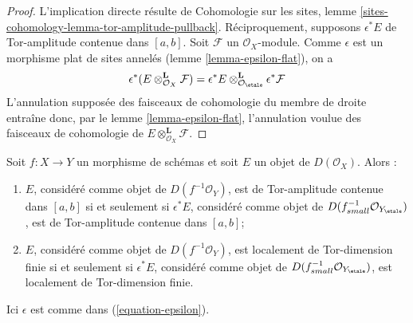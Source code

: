 \begin{proof}
L'implication directe r\'esulte de Cohomologie sur les sites, lemme
\ref{sites-cohomology-lemma-tor-amplitude-pullback}.
R\'eciproquement, supposons $\epsilon^*E$ de Tor-amplitude contenue dans
$[a,b]$.
Soit $\mathcal{F}$ un $\mathcal{O}_X$-module. Comme $\epsilon$ est un
morphisme plat de sites annel\'es (lemme \ref{lemma-epsilon-flat}), on a
$$
\epsilon^*(E \otimes^\mathbf{L}_{\mathcal{O}_X} \mathcal{F})
=
\epsilon^*E
\otimes^\mathbf{L}_{\mathcal{O}_\etale}
\epsilon^*\mathcal{F}
$$
L'annulation suppos\'ee des faisceaux de cohomologie du membre de droite
entra\^ine donc, par le lemme \ref{lemma-epsilon-flat}, l'annulation voulue
des faisceaux de cohomologie de
$E \otimes^\mathbf{L}_{\mathcal{O}_X} \mathcal{F}$.
\end{proof}

\begin{lemma}
\label{lemma-tor-dimension-rel}
Soit $f : X \to Y$ un morphisme de sch\'emas et soit $E$ un objet de
$D(\mathcal{O}_X)$. Alors :
\begin{enumerate}
\item $E$, consid\'er\'e comme objet de $D(f^{-1}\mathcal{O}_Y)$, est
de Tor-amplitude contenue dans $[a,b]$ si et seulement si $\epsilon^*E$,
consid\'er\'e
comme objet de $D(f_{small}^{-1}\mathcal{O}_{Y_\etale})$, est de Tor-amplitude
contenue dans $[a,b]$;
\item $E$, consid\'er\'e comme objet de $D(f^{-1}\mathcal{O}_Y)$, est
localement de Tor-dimension finie si et seulement si $\epsilon^*E$,
consid\'er\'e comme objet de
$D(f_{small}^{-1}\mathcal{O}_{Y_\etale})$, est localement de Tor-dimension
finie.
\end{enumerate}
Ici $\epsilon$ est comme dans (\ref{equation-epsilon}).
\end{lemma}

